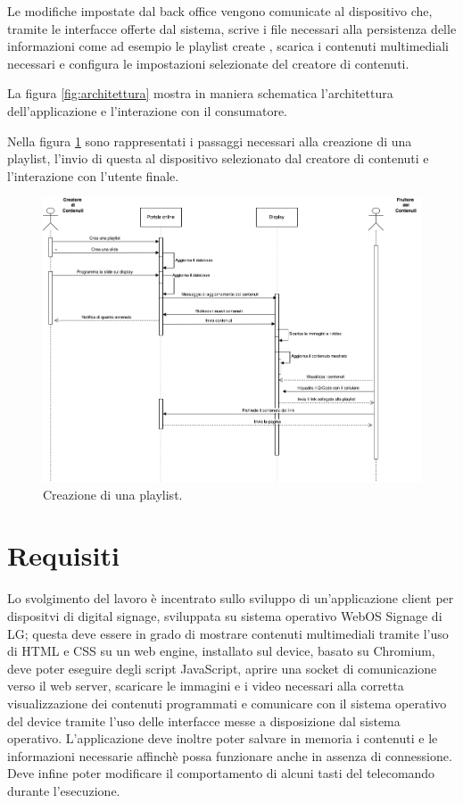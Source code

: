 Le modifiche impostate dal back office vengono comunicate al dispositivo che, tramite le interfacce offerte dal sistema, scrive i file necessari alla persistenza delle informazioni come ad esempio le playlist create , scarica i contenuti multimediali necessari e configura le impostazioni selezionate del creatore di contenuti.

La figura \ref*{fig:architettura} mostra in maniera schematica l'architettura dell'applicazione e l'interazione con il consumatore.

Nella figura \ref*{fig:use_case} sono rappresentati i passaggi necessari alla creazione di una playlist, l'invio di questa al dispositivo selezionato dal creatore di contenuti e l'interazione con l'utente finale.

\begin{figure}[H]
    \centering
    \includegraphics[width= 1.1\textwidth]{images/Introduzione/diagramma_flusso.png} 
    \caption{Creazione di una playlist.} 
    \label{fig:use_case}
\end{figure}



\section{Requisiti}
Lo svolgimento del lavoro è incentrato sullo sviluppo di un'applicazione client per dispositvi di digital signage, sviluppata su sistema operativo WebOS Signage di LG; questa deve essere in grado di mostrare contenuti multimediali tramite l'uso di HTML e CSS su un web engine, installato sul device, basato su Chromium, deve poter eseguire degli script JavaScript, aprire una socket di comunicazione verso il web server, scaricare le immagini e i video necessari alla corretta visualizzazione dei contenuti programmati e comunicare con il sistema operativo del device tramite l'uso delle interfacce messe a disposizione dal sistema operativo.
L'applicazione deve inoltre poter salvare in memoria i contenuti e le informazioni necessarie affinchè possa funzionare anche in assenza di connessione. Deve infine poter modificare il comportamento di alcuni tasti del telecomando durante l'esecuzione.


